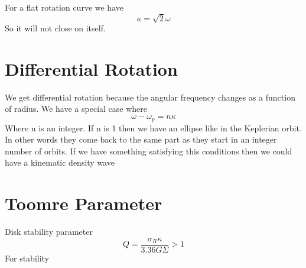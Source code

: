 For a flat rotation curve we have
\begin{equation}
\kappa = \sqrt{2} \omega
\end{equation}
So it will not close on itself. 


\section{Differential Rotation}
We get differential rotation because the angular frequency changes as a function of radius. We have a special case where
\begin{equation}
\omega - \omega_p = n\kappa
\end{equation}
Where n is an integer. If n is 1 then we have an ellipse like in the Keplerian orbit. In other words they come back to the same part as they start in an integer number of orbits. If we have something satisfying this conditions then we could have a kinematic density wave


\section{Toomre Parameter}
Disk stability parameter
\begin{equation}
Q =\frac{\sigma_R \kappa}{3.36 G\Sigma} > 1
\end{equation}
For stability


